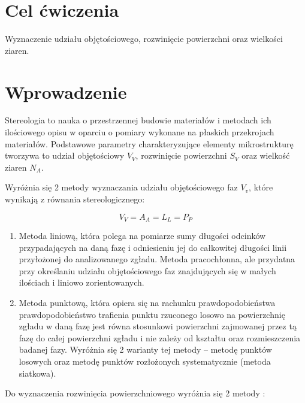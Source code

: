 \documentclass[a4paper,12pt]{article}
\begin{document}
    



\section{Cel ćwiczenia}

Wyznaczenie udziału objętościowego, rozwinięcie powierzchni oraz wielkości ziaren.

\section{Wprowadzenie}

Stereologia to nauka o przestrzennej budowie materiałów i metodach ich ilościowego opisu w oparciu o pomiary wykonane na płaskich przekrojach materiałów. Podstawowe parametry charakteryzujące elementy mikrostrukturę tworzywa to udział objętościowy $V_V$, rozwinięcie powierzchni $S_V$ oraz wielkość ziaren $N_A$.

Wyróżnia się 2 metody wyznaczania udziału objętościowego faz $V_v$, które wynikają z równania stereologicznego:

$$V_V=A_A=L_L=P_P$$

\begin{enumerate}
    \item Metoda liniową, która polega na pomiarze sumy długości  odcinków przypadających na daną fazę i odniesieniu jej do całkowitej długości linii przyłożonej do analizowanego zgładu. Metoda pracochłonna, ale przydatna przy określaniu udziału objętościowego faz znajdujących się w małych ilościach i liniowo zorientowanych. 
    \item Metoda punktową, która opiera się na rachunku prawdopodobieństwa  prawdopodobieństwo trafienia punktu rzuconego losowo na powierzchnię zgładu w daną fazę jest równa stosunkowi powierzchni zajmowanej przez tą fazę do całej powierzchni zgładu i nie zależy od kształtu oraz rozmieszczenia badanej fazy. Wyróżnia się 2 warianty tej metody – metodę punktów losowych oraz metodę punktów rozłożonych systematycznie (metoda siatkowa).
\end{enumerate}

\newpage

Do wyznaczenia rozwinięcia powierzchniowego wyróżnia się 2 metody :
\end{document}
